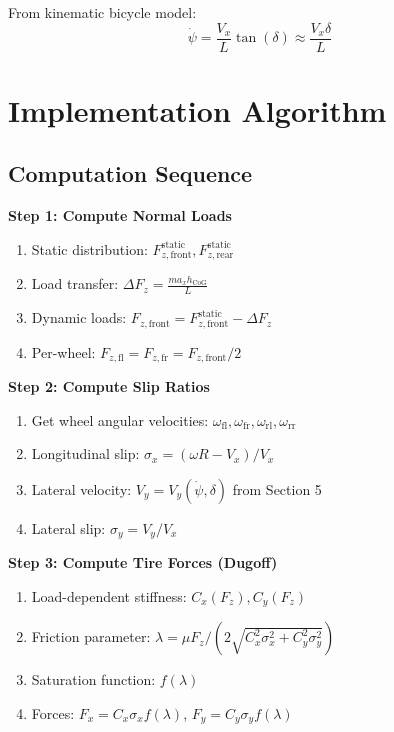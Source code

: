 \documentclass[11pt,a4paper]{article}
\begin{document}
From kinematic bicycle model:
\begin{equation}
\dot{\psi} = \frac{V_x}{L} \tan(\delta) \approx \frac{V_x \delta}{L}
\end{equation}

\section{Implementation Algorithm}

\subsection{Computation Sequence}

\textbf{Step 1: Compute Normal Loads}
\begin{enumerate}
    \item Static distribution: $F_{z,\text{front}}^{\text{static}}, F_{z,\text{rear}}^{\text{static}}$
    \item Load transfer: $\Delta F_z = \frac{m a_x h_{\text{CoG}}}{L}$
    \item Dynamic loads: $F_{z,\text{front}} = F_{z,\text{front}}^{\text{static}} - \Delta F_z$
    \item Per-wheel: $F_{z,\text{fl}} = F_{z,\text{fr}} = F_{z,\text{front}} / 2$
\end{enumerate}

\textbf{Step 2: Compute Slip Ratios}
\begin{enumerate}
    \item Get wheel angular velocities: $\omega_{\text{fl}}, \omega_{\text{fr}}, \omega_{\text{rl}}, \omega_{\text{rr}}$
    \item Longitudinal slip: $\sigma_x = (\omega R - V_x) / V_x$
    \item Lateral velocity: $V_y = V_y(\dot{\psi}, \delta)$ from Section 5
    \item Lateral slip: $\sigma_y = V_y / V_x$
\end{enumerate}

\textbf{Step 3: Compute Tire Forces (Dugoff)}
\begin{enumerate}
    \item Load-dependent stiffness: $C_x(F_z), C_y(F_z)$
    \item Friction parameter: $\lambda = \mu F_z / (2\sqrt{C_x^2 \sigma_x^2 + C_y^2 \sigma_y^2})$
    \item Saturation function: $f(\lambda)$
    \item Forces: $F_x = C_x \sigma_x f(\lambda)$, $F_y = C_y \sigma_y f(\lambda)$
\end{enumerate}
\end{document}
